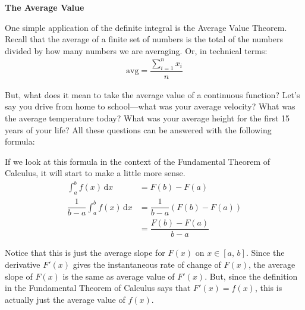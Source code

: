 \bigskip

\textbf{\large{The Average Value}}

One simple application of the definite integral is the Average Value Theorem. Recall that the average of a finite set of numbers is the total of the numbers divided by how many numbers we are averaging. Or, in technical terms: \begin{align*}
    \mathrm{avg} = \dfrac{\sum_{i = 1}^n x_i}{n}
\end{align*}

But, what does it mean to take the average value of a continuous function? Let's say you drive from home to school---what was your average velocity? What was the average temperature today? What was your average height for the first 15 years of your life? All these questions can be answered with the following formula: \par

\begin{center}
\end{center}

If we look at this formula in the context of the Fundamental Theorem of Calculus, it will start to make a little more sense. \begin{align*}
    \int_a^b f(x) \,\mathrm{d}x &= F(b) - F(a) \\[5.5pt]
    \dfrac{1}{b - a}\int_a^b f(x) \,\mathrm{d}x &= \dfrac{1}{b - a}(F(b) - F(a)) \\[5.5pt]
    & = \dfrac{F(b) - F(a)}{b - a}
\end{align*}

Notice that this is just the average slope for $F(x)$ on $x \in [a, \, b]$. Since the derivative $F'(x)$ gives the instantaneous rate of change of $F(x)$, the average slope of $F(x)$ is the same as average value of $F'(x)$. But, since the definition in the Fundamental Theorem of Calculus says that $F'(x) = f(x)$, this is actually just the average value of $f(x)$. \par


